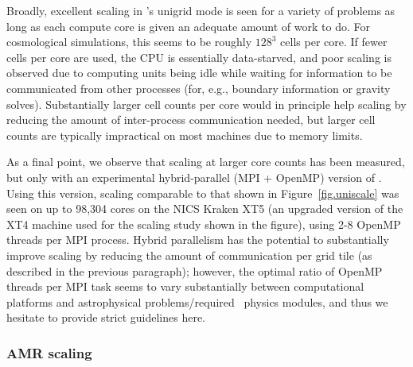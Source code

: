 Broadly, excellent scaling in \enzo's unigrid mode is seen for a
variety of problems as long as each compute core is given an adequate
amount of work to do.  For cosmological simulations, this seems to be
roughly $128^3$ cells per core.  If fewer cells per core are used, the
CPU is essentially data-starved, and poor scaling is observed due to
computing units being idle while waiting for information to be
communicated from other processes (for, e.g., boundary information or
gravity solves).  Substantially larger cell counts per core would in
principle help scaling by reducing the amount of inter-process
communication needed, but larger cell counts are typically impractical
on most machines due to memory limits.

As a final point, we observe that scaling at larger core counts has
been measured, but only with an experimental hybrid-parallel (MPI +
OpenMP) version of \enzo.  Using this version, scaling comparable to
that shown in Figure~\ref{fig.uniscale} was seen on up to 98,304 cores
on the NICS Kraken XT5 (an upgraded version of the XT4 machine used
for the scaling study shown in the figure), using 2-8 OpenMP threads
per MPI process.  Hybrid parallelism has the potential to
substantially improve scaling by reducing the amount of communication
per grid tile (as described in the previous paragraph); however, the
optimal ratio of OpenMP threads per MPI task seems to vary
substantially between computational platforms and astrophysical
problems/required \enzo\ physics modules, and thus we hesitate to
provide strict guidelines here.

\subsubsection{AMR scaling}


